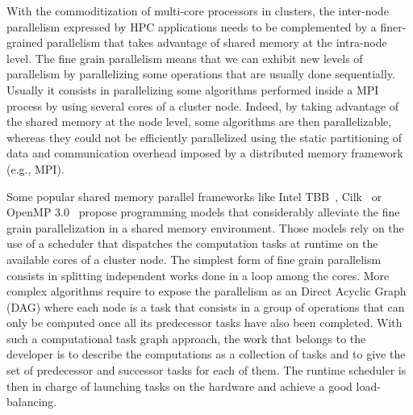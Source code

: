 
With the commoditization of multi-core processors in clusters, the
inter-node parallelism expressed by HPC applications needs to be
complemented by a finer-grained parallelism that takes advantage of shared
memory at the intra-node level. The fine grain parallelism means that we can
exhibit new levels of parallelism by parallelizing some operations that are
usually done sequentially. Usually it consists in parallelizing some algorithms
performed inside a MPI process by using several cores of a cluster node. Indeed, by
taking advantage of the shared memory at the node level, some algorithms are
then parallelizable, whereas they could not be efficiently parallelized using the
static partitioning of data and communication overhead imposed by a distributed
memory framework (e.g., MPI).


Some popular shared memory parallel frameworks like Intel TBB~\cite{Intel::TBB},
Cilk~\cite{cilk} or OpenMP 3.0~\cite{openmp08} propose programming models that
considerably alleviate the fine grain parallelization in a shared memory environment. 
Those models rely on the use of a scheduler that dispatches the computation tasks
at runtime on the available cores of a cluster node. The simplest form of fine grain
parallelism consists in splitting independent works done in a loop among the cores.
More complex algorithms require to expose the parallelism as an Direct Acyclic Graph (DAG)
where each node is a task that consists in a group of operations that
can only be computed once all its predecessor tasks have also been completed.
With such a computational task graph approach, the work that belongs to the developer
is to describe the computations as a collection of tasks and to give  the set of
predecessor and successor tasks for each of them. The runtime scheduler is then
in charge of launching tasks on the hardware and achieve a good load-balancing.

